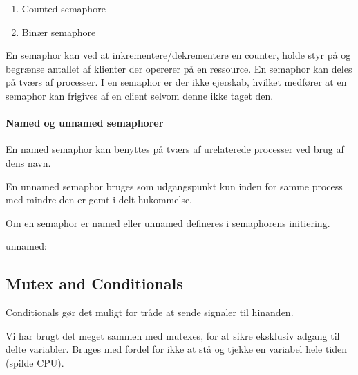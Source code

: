 \begin{enumerate}
	\item Counted semaphore
	\item Binær semaphore
\end{enumerate}

En semaphor kan ved at inkrementere/dekrementere en counter, holde styr på og begrænse antallet af klienter der opererer på en ressource. En semaphor kan deles på tværs af processer. I en semaphor er der ikke ejerskab, hvilket medfører at en semaphor kan frigives af en client selvom denne ikke taget den.

\paragraph{Named og unnamed semaphorer}
En named semaphor kan benyttes på tværs af urelaterede processer ved brug af dens navn.

En unnamed semaphor bruges som udgangspunkt kun inden for samme process med mindre den er gemt i delt hukommelse. 

Om en semaphor er named eller unnamed defineres i semaphorens initiering.

unnamed: 

\subsection{Mutex and Conditionals}
Conditionals gør det muligt for tråde at sende signaler til hinanden.

Vi har brugt det meget sammen med mutexes, for at sikre eksklusiv adgang til delte variabler. Bruges med fordel for ikke at stå og tjekke en variabel hele tiden (spilde CPU).

